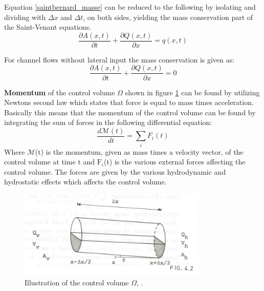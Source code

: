 Equation \ref{saintbernard_masse} can be reduced to the following by isolating and dividing with $\Delta x$ and $\Delta t$, on both sides, yielding the mass conservation part of the Saint-Venant equations.
\begin{equation}	
\frac{\partial A(x,t)}{\partial t} + \frac{\partial Q(x,t)}{\partial x}=q(x,t)
\label{saintbernard_mass_lateral}
\end{equation}

For channel flows without lateral input the mass conservation is given as:
\begin{equation}	
\boxed{\frac{\partial A(x,t)}{\partial t} + \frac{\partial Q(x,t)}{\partial x}=0}
\label{saintbernard_mass}
\end{equation}


\textbf{Momentum} of the control volume $\Omega$ shown in figure \ref{fig:momentum_picture} can be found by utilizing Newtons second law which states that force is equal to mass times acceleration.  
Basically this means that the momentum of the control volume can be found by integrating the sum of forces in the following differential equation:
\begin{equation}\label{eq:momentum_eq}
	\frac{d \mathcal{M}(t)}{dt} = \sum_{i}F_i(t)
\end{equation} 
Where $\mathcal{M}$(t) is the momentum, given as mass times a velocity vector, of the control volume at time t and $\text{F}_i$(t) is the various external forces affecting the control volume. The forces are given by the various hydrodynamic and hydrostatic effects which affects the control volume.  

\begin{figure}[H]
\centering
\includegraphics[width=0.8\textwidth]{report/modeling/pictures/momentum_picture.png}
\caption{Illustration of the control volume $\Omega$, .}
\label{fig:momentum_picture}
\end{figure}

